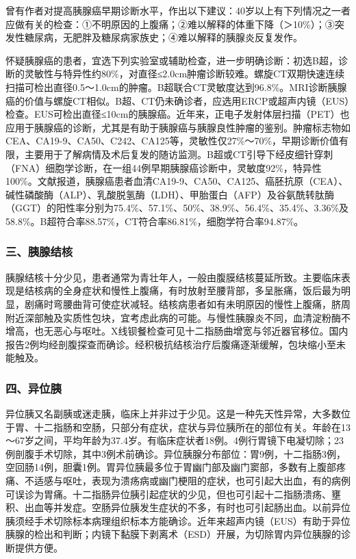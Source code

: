 曾有作者对提高胰腺癌早期诊断水平，作出以下建议：40岁以上有下列情况之一者应做有关的检查：①不明原因的上腹痛；②难以解释的体重下降（＞10\%）；③突发性糖尿病，无肥胖及糖尿病家族史；④难以解释的胰腺炎反复发作。

怀疑胰腺癌的患者，宜选下列实验室或辅助检查，进一步明确诊断：初选B超，诊断的灵敏性与特异性约80\%，对直径≤2.0cm肿瘤诊断较难。螺旋CT双期快速连续扫描可检出直径0.5～1.0cm的肿瘤。B超联合CT灵敏度达到96.8\%。MRI诊断胰腺癌的价值与螺旋CT相似。B超、CT仍未确诊者，应选用ERCP或超声内镜（EUS）检查。EUS可检出直径≤10cm的胰腺癌。近年来，正电子发射体层扫描（PET）也应用于胰腺癌的诊断，尤其是有助于胰腺癌与胰腺良性肿瘤的鉴别。肿瘤标志物如CEA、CA19-9、CA50、C242、CA125等，灵敏性仅27\%～70\%，早期诊断价值有限，主要用于了解病情及术后复发的随访监测。B超或CT引导下经皮细针穿刺（FNA）细胞学诊断，在一组44例早期胰腺癌诊断中，灵敏度92\%，特异性100\%。文献报道，胰腺癌患者血清CA19-9、CA50、CA125、癌胚抗原（CEA）、碱性磷酸酶（ALP）、乳酸脱氢酶（LDH）、甲胎蛋白（AFP）及谷氨酰转肽酶（GGT）的阳性率分别为75.4\%、57.1\%、50\%、38.9\%、56.4\%、35.4\%、3.36\%及58.8\%。B超符合率88.57\%，CT符合率86.81\%，细胞学符合率94.87\%。

\subsubsection{三、胰腺结核}

胰腺结核十分少见，患者通常为青壮年人，一般由腹膜结核蔓延所致。主要临床表现是结核病的全身症状和慢性上腹痛，有时放射至腰背部，多呈胀痛，饭后最为明显，剧痛时弯腰曲背可使症状减轻。结核病患者如有未明原因的慢性上腹痛，脐周附近深部触及实质性包块，宜考虑此病的可能。与慢性胰腺炎不同，血清淀粉酶不增高，也无恶心与呕吐。X线钡餐检查可见十二指肠曲增宽与邻近器官移位。国内报告2例均经剖腹探查而确诊。经积极抗结核治疗后腹痛逐渐缓解，包块缩小至未能触及。

\subsubsection{四、异位胰}

异位胰又名副胰或迷走胰，临床上并非过于少见。这是一种先天性异常，大多数位于胃、十二指肠和空肠，只部分有症状，症状与异位胰所在的部位有关。年龄在13～67岁之间，平均年龄为37.4岁。有临床症状者18例。4例行胃镜下电凝切除；23例剖腹手术切除，其中3例术前确诊。异位胰腺分布部位：胃9例，十二指肠3例，空回肠14例，胆囊1例。胃异位胰最多位于胃幽门部及幽门窦部，多数有上腹部疼痛、不适感与呕吐，表现为溃疡病或幽门梗阻的症状，也可引起大出血，有的病例可误诊为胃痛。十二指肠异位胰引起症状的少见，但也可引起十二指肠溃疡、壅积、出血等并发症。空肠异位胰发生症状的不多，有时也可引起肠出血。以前异位胰须经手术切除标本病理组织标本方能确诊。近年来超声内镜（EUS）有助于异位胰腺的检出和判断；内镜下黏膜下剥离术（ESD）开展，为切除胃内异位胰腺的诊断提供方便。

